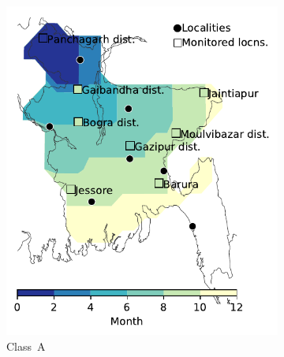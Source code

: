 \documentclass[11pt]{article}
\newcommand{\ald}{\alpha_{\ell d}}
\theoremstyle{definition}
\begin{document}
\begin{figure}[t]
    \centering
\begin{subfigure}[b]{.3\textwidth}
    \includegraphics[width=\textwidth]{BGD_model-A.pdf}
    \caption{Class~A \label{fig:bgdClassA}}  %
\end{subfigure}\hspace{.5cm}
\begin{subfigure}[b]{.3\textwidth}

\end{subfigure}
\end{figure}
\end{document}
